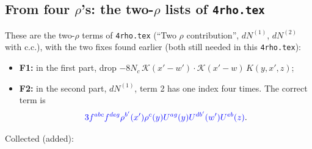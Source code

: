 \documentclass[10pt]{article}
\numberwithin{equation}{section}
\newcommand{\new}[1]{{\color{blue}#1}}
\newcommand{\old}[1]{{\color{red}#1}}
\begin{document}
\subsection{From four $\rho$'s: the two-$\rho$ lists of \texttt{4rho.tex} }
These are the two-$\rho$ terms of \texttt{4rho.tex} (``Two $\rho$ contribution'', $dN^{(1)}$, $dN^{(2)}$ with c.c.), with the two fixes found earlier (both still needed in this \texttt{4rho.tex}):
\begin{itemize}
\item \textbf{F1:} in the first part, drop \old{$-8N_c\,\mathcal K(x'-w')\cdot\mathcal K(x'-w)\,K(y,x',z)$};
\item \textbf{F2:} in the second part, $dN^{(1)}$, term 2 has one index four times. The correct term is
\begin{equation*}\new{3f^{abc}f^{deg}\rho^{b'}(x')\rho^c(y)U^{ag}(y)U^{db'}(w')U^{eb}(z)}.\end{equation*}
\end{itemize}
Collected (\new{added}):
\end{document}
